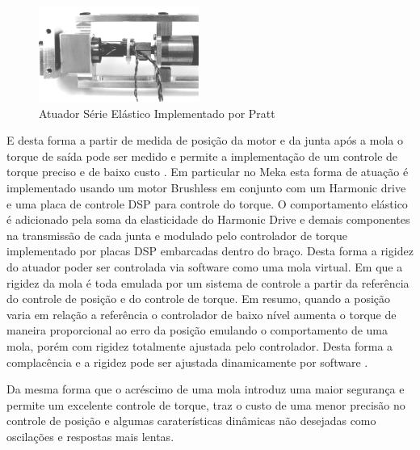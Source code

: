 \begin{figure}[H]
    \centering
    \includegraphics[width=0.6\linewidth]{tex/figs/sea_pratt.png}
    \caption{Atuador Série Elástico Implementado por Pratt \cite{pratt1997stiffness}}
    \label{fig:seapratt}
\end{figure}

E desta forma a partir de medida de posição da motor e da junta após a mola o torque de saída pode ser medido e permite a implementação de um controle de torque preciso e de baixo custo \cite{pratt1997stiffness}. Em particular no Meka esta forma de atuação é implementado usando um motor Brushless em conjunto com um Harmonic drive e uma placa de controle DSP para controle do torque. O comportamento elástico é adicionado pela soma da elasticidade do Harmonic Drive e demais componentes na transmissão de cada junta e modulado pelo controlador de torque implementado por placas DSP embarcadas dentro do braço. Desta forma a rigidez do atuador poder ser controlada via software como uma mola virtual. Em que a rigidez da mola é toda emulada por um sistema de controle a partir da referência do controle de posição e do controle de torque. Em resumo, quando a posição varia em relação a referência o controlador de baixo nível aumenta o torque de maneira proporcional ao erro da posição emulando o comportamento de uma mola, porém com rigidez totalmente ajustada pelo controlador. Desta forma a complacência e a rigidez pode ser ajustada dinamicamente por software \cite{abeyrathna2013simulation}.

Da mesma forma que o acréscimo de uma mola introduz uma maior segurança e permite um excelente controle de torque, traz o custo de uma menor precisão no controle de posição e algumas caraterísticas dinâmicas não desejadas como oscilações e respostas mais lentas.



